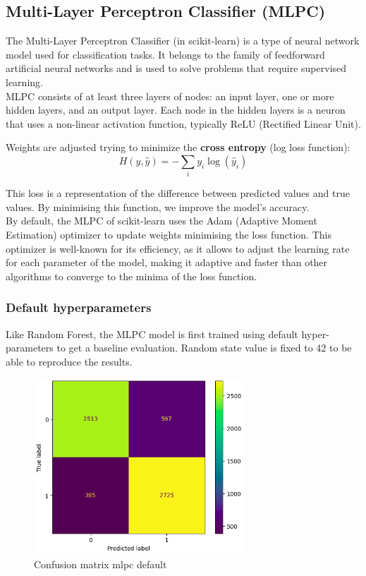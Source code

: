 \documentclass[a4paper,12pt]{article}
\begin{document}
\subsection{Multi-Layer Perceptron Classifier (MLPC)}


The Multi-Layer Perceptron Classifier (in scikit-learn) is a type of neural network model used for classification tasks. It belongs to the family of feedforward artificial neural networks and is used to solve problems that require supervised learning.\\

MLPC consists of at least three layers of nodes: an input layer, one or more hidden layers, and an output layer. Each node in the hidden layers is a neuron that uses a non-linear activation function, typically ReLU (Rectified Linear Unit).

Weights are adjusted trying to minimize the \textbf{cross entropy} (log loss function):
\begin{equation} \label{cross_entropy}
H(y, \hat{y}) = -\sum_{i} y_i \log(\hat{y}_i)
\end{equation}

This loss is a representation of the difference between predicted values and true values. By minimising this function, we improve the model's accuracy.\\

By default, the MLPC of scikit-learn uses the Adam (Adaptive Moment Estimation) optimizer to update weights minimising the loss function. This optimizer is well-known for its efficiency, as it allows to adjust the learning rate for each parameter of the model, making it adaptive and faster than other algorithms to converge to the minima of the loss function.


\subsubsection{Default hyperparameters}

Like Random Forest, the MLPC model is first trained using default hyper-parameters to get a baseline evaluation. Random state value is fixed to 42 to be able to reproduce the results.\\

\begin{figure}[H]
  \centering
  \includegraphics[width=0.7\textwidth]{./images/cm_mlpc_default.png}
  \caption{Confusion matrix mlpc default}
  \label{fig:cm_mlpc_default}
\end{figure}
\end{document}
